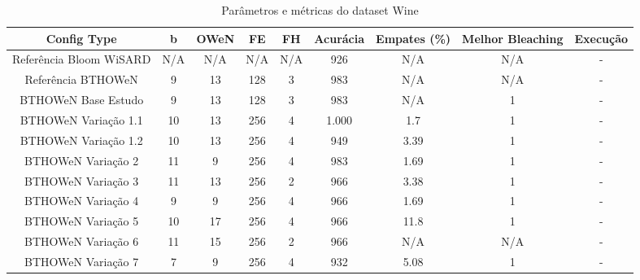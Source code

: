 \documentclass{article}
\begin{document}
{\begin{longtable}{|c|c|c|c|c|c|c|c|c|}
\caption{Parâmetros e métricas do dataset Wine} \\
\hline
\textbf{Config Type} & \textbf{b} & \textbf{OWeN} & \textbf{FE} & \textbf{FH} & \textbf{Acurácia} & \textbf{Empates (\%)} & \textbf{Melhor Bleaching} & \textbf{Execução} \\
\hline
Referência Bloom WiSARD & N/A & N/A & N/A & N/A & 926 & N/A & N/A & - \\
\hline
Referência BTHOWeN & 9 & 13 & 128 & 3 & 983 & N/A & N/A & - \\
\hline
BTHOWeN Base Estudo & 9 & 13 & 128 & 3 & 983 & N/A & 1 & - \\
\hline
BTHOWeN Variação 1.1 & 10 & 13 & 256 & 4 & 1.000 & 1.7 & 1 & - \\
\hline
BTHOWeN Variação 1.2 & 10 & 13 & 256 & 4 & 949 & 3.39 & 1 & - \\
\hline
BTHOWeN Variação 2 & 11 & 9 & 256 & 4 & 983 & 1.69 & 1 & - \\
\hline
BTHOWeN Variação 3 & 11 & 13 & 256 & 2 & 966 & 3.38 & 1 & - \\
\hline
BTHOWeN Variação 4 & 9 & 9 & 256 & 4 & 966 & 1.69 & 1 & - \\
\hline
BTHOWeN Variação 5 & 10 & 17 & 256 & 4 & 966 & 11.8 & 1 & - \\
\hline
BTHOWeN Variação 6 & 11 & 15 & 256 & 2 & 966 & N/A & N/A & - \\
\hline
BTHOWeN Variação 7 & 7 & 9 & 256 & 4 & 932 & 5.08 & 1 & - \\
\hline
\end{longtable}

}
\end{document}
